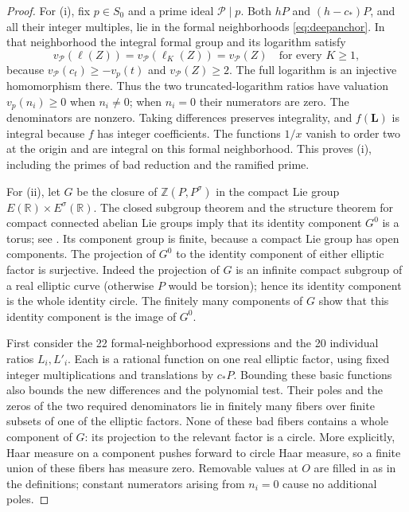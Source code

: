 \documentclass[11pt,reqno]{amsart}
\theoremstyle{definition}
\numberwithin{equation}{section}
\newcommand{\Z}{\mathbb Z}
\begin{document}
\begin{proof}
For (i), fix $p\in S_0$ and a prime ideal ${\mathcal P}\mid p$. Both $hP$ and $(h-c_\ast)P$, and all their integer multiples, lie in the formal neighborhoods \eqref{eq:deepanchor}. In that neighborhood the integral formal group and its logarithm satisfy
\[
 v_{\mathcal P}(\ell(Z))=v_{\mathcal P}(\ell_K(Z))=v_{\mathcal P}(Z)
 \quad\text{for every }K\ge1,
\]
because $v_{\mathcal P}(c_t)\ge-v_p(t)$ and $v_{\mathcal P}(Z)\ge2$. The full logarithm is an injective homomorphism there. Thus the two truncated-logarithm ratios have valuation $v_p(n_i)\ge0$ when $n_i\ne0$; when $n_i=0$ their numerators are zero. The denominators are nonzero. Taking differences preserves integrality, and $f(\mathbf L)$ is integral because $f$ has integer coefficients. The functions $1/x$ vanish to order two at the origin and are integral on this formal neighborhood. This proves (i), including the primes of bad reduction and the ramified prime.

For (ii), let $G$ be the closure of $\Z(P,P^\sigma)$ in the compact Lie group $E(\mathbb R)\times E^\sigma(\mathbb R)$. The closed subgroup theorem and the structure theorem for compact connected abelian Lie groups imply that its identity component $G^0$ is a torus; see \cite{Hall}. Its component group is finite, because a compact Lie group has open components. The projection of $G^0$ to the identity component of either elliptic factor is surjective. Indeed the projection of $G$ is an infinite compact subgroup of a real elliptic curve (otherwise $P$ would be torsion); hence its identity component is the whole identity circle. The finitely many components of $G$ show that this identity component is the image of $G^0$.

First consider the 22 formal-neighborhood expressions and the 20 individual ratios $L_i,L'_i$. Each is a rational function on one real elliptic factor, using fixed integer multiplications and translations by $c_\ast P$. Bounding these basic functions also bounds the new differences and the polynomial test. Their poles and the zeros of the two required denominators lie in finitely many fibers over finite subsets of one of the elliptic factors. None of these bad fibers contains a whole component of $G$: its projection to the relevant factor is a circle. More explicitly, Haar measure on a component pushes forward to circle Haar measure, so a finite union of these fibers has measure zero. Removable values at $O$ are filled in as in the definitions; constant numerators arising from $n_i=0$ cause no additional poles.


\end{proof}
\end{document}
